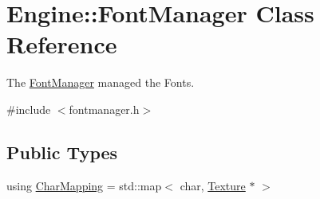 \hypertarget{classEngine_1_1FontManager}{}\section{Engine\+:\+:Font\+Manager Class Reference}
\label{classEngine_1_1FontManager}


The \hyperlink{classEngine_1_1FontManager}{Font\+Manager} managed the Fonts.  




{\ttfamily \#include $<$fontmanager.\+h$>$}

\subsection*{Public Types}
\begin{DoxyCompactItemize}
\item 
using \hyperlink{classEngine_1_1FontManager_aba32832f74f13b0bec53d5132f78bcc3}{Char\+Mapping} = std\+::map$<$ char, \hyperlink{classEngine_1_1Texture}{Texture} $\ast$ $>$
\end{DoxyCompactItemize}
